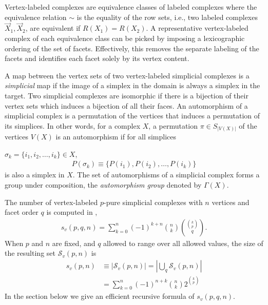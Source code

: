 \documentclass[12pt]{article}
\theoremstyle{plain}
\theoremstyle{definition}
\theoremstyle{remark}
\newcommand{\CR}{\nonumber\\}
\begin{document}
Vertex-labeled complexes are equivalence classes of labeled complexes where the equivalence relation $\sim$ is the equality of the row sets, i.e., two labeled complexes $\vec{X}_1, \vec{X}_2$, are equivalent if $R(X_1)=R(X_2)$. A representative vertex-labeled complex of each equivalence class can be picked by imposing a lexicographic ordering of the set of facets. Effectively, this removes the separate labeling of the facets and identifies each facet solely by its vertex content.

A map between the vertex sets of two vertex-labeled simplicial complexes is a {\em simplicial} map if the image of a simplex in the domain is always a simplex in the target. Two simplicial complexes are isomorphic if there is a bijection of their vertex sets which induces a bijection of all their faces. An automorphism of a simplicial complex is a permutation  of the vertices that induces a permutation of its simplices. In other words, for a complex $X$, a permutation $\pi\in S_{|V(X)|}$ of the vertices $V(X)$ is an automorphism if for all simplices

$\sigma_k=\{i_1,i_2,\dots,i_k\} \in X$,  \begin{align}
\label{eq:SnAction}
    P(\sigma_k)\equiv\{P(i_{1}),P(i_2),\dots,P(i_k)\}
\end{align}
is also a simplex in $X$. The set of automorphisms of a simplicial complex forms a group under composition, the {\em automorphism group} denoted by $\Gamma(X)$.

The number of vertex-labeled $p$-pure simplicial complexes with $n$ vertices and facet order $q$ is computed in \cite{betre2024pure},
\begin{align}
    s_v(p,q,n)=\sum_{k=0}^n(-1)^{k+n}\binom{n}{k}\binom{\binom{k}{p}}{q}.
\end{align}
When $p$ and $n$ are fixed, and $q$ allowed to range over all allowed values, the size of the resulting set $\mathcal{S}_v(p,n)$ is 
\begin{align}
    s_v(p,n)&\equiv |\mathcal{S}_v(p,n)|=\left|\bigcup_{q}\mathcal{S}_v(p,n)\right|\CR
    &=\sum_{k=0}^n(-1)^{n+k}\binom{n}{k}2^{\binom{k}{p}}
\end{align} 
In the section below we give an efficient recursive formula of $s_v(p,q,n)$.
\end{document}
